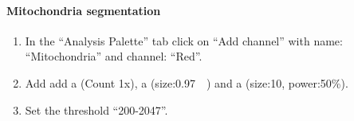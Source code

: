 \paragraph{Mitochondria segmentation}
\begin{enumerate}
    \item In the ``Analysis Palette'' tab click on ``Add channel'' with name: ``Mitochondria'' and channel: ``Red''.
    \item Add add a  (Count 1x), a  (size:\SI{0.97}{\micro\mater}) and a  (size:10,  
power:50\%).
    \item Set the threshold ``200-2047''.
\end{enumerate}

\paragraph{}
